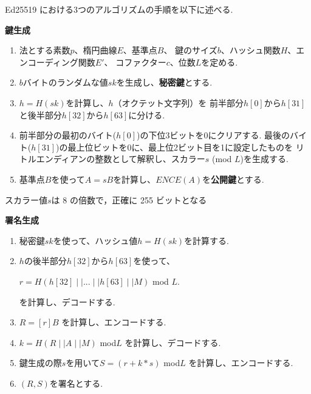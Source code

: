 Ed25519 における3つのアルゴリズムの手順を以下に述べる.\\[1em]
\begin{mdframed}[linecolor=black,roundcorner=10pt]
  \textbf{鍵生成}
  \begin{enumerate}[parsep=7pt]
    \item 法とする素数$p$、楕円曲線$E$、基準点$B$、
          鍵のサイズ$b$、ハッシュ関数$H$、エンコーディング関数$E'$、
          コファクター$c$、位数$L$を定める.
    \item $b$バイトのランダムな値$sk$を生成し、\textbf{秘密鍵}とする.
    \item $h = H(sk)$を計算し、$h$（オクテット文字列）を
    前半部分$h[0]$から$h[31]$と後半部分$h[32]$から$h[63]$に分ける.
    \item 前半部分の最初のバイト($h[0]$)の下位3ビットを0にクリアする.
    最後のバイト($h[31]$)の最上位ビットを0に、最上位2ビット目を1に設定したものを
    リトルエンディアンの整数として解釈し、スカラー$s$ (mod $L$)を生成する.
    \item 基準点$B$を使って$A = sB$を計算し、$ENCE(A)$を\textbf{公開鍵}とする.
  \end{enumerate}
  スカラー値$s$は 8 の倍数で，正確に 255 ビットとなる
\end{mdframed}
\vspace{2em}
\begin{mdframed}[linecolor=black,roundcorner=10pt]
  \textbf{署名生成}
  \begin{enumerate}[parsep=7pt]
    \item 秘密鍵$sk$を使って、ハッシュ値$h=H(sk)$を計算する.
    \item $h$の後半部分$h[32]$から$h[63]$を使って、
    \begin{center}
      $r = H(h[32]\mid\mid ... \mid\mid h[63] \mid\mid M)$ mod $L$.
    \end{center}
    を計算し、デコードする.
    \item $R=[r]B$ を計算し、エンコードする.
    \item $k=H(R \mid\mid A \mid\mid M)$ mod$L$ を計算し、デコードする.
    \item 鍵生成の際$s$を用いて$S=(r+k*s)$ mod$L$ を計算し、エンコードする.
    \item $(R,S)$を署名とする.
  \end{enumerate}
\end{mdframed}
\vspace{2em}

